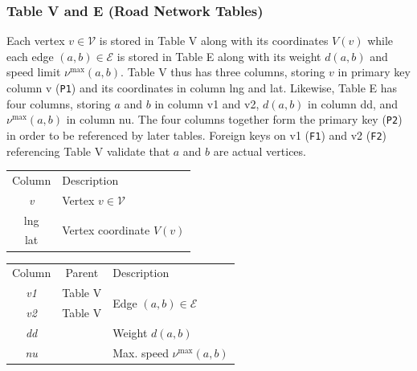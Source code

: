 \documentclass{article}
\theoremstyle{definition}
\begin{document}
\subsubsection{Table V and E (Road Network Tables)}
Each vertex $v\in\mathcal{V}$ is stored in Table V along with its coordinates
$V(v)$ while each edge $(a,b)\in\mathcal{E}$ is stored in Table E along with
its weight $d(a,b)$ and speed limit $\nu^\textrm{max}(a,b)$.  Table V thus has
three columns, storing $v$ in primary key column \textsf{v} ({\tt{}P1}) and its
coordinates in column \textsf{lng} and \textsf{lat}.  Likewise, Table E has
four columns, storing $a$ and $b$ in column \textsf{v1} and \textsf{v2},
$d(a,b)$ in column \textsf{dd}, and $\nu^\textrm{max}(a,b)$ in column
\textsf{nu}.  The four columns together form the primary key ({\tt{}P2}) in order
to be referenced by later tables.  Foreign keys on \textsf{v1} ({\tt{}F1}) and
\textsf{v2} ({\tt{}F2}) referencing Table V validate that $a$ and $b$ are actual
vertices.
\begin{table}[h]
\centering
\small
\begin{tabular}{|c|l|}
\hline
\rowcolor{TableTitle}
\multicolumn{2}{|c|}{Table V (Vertices)}\\
\hline
\rowcolor{TableHeader}
Column & Description\\
\hline
\textit{v} & Vertex $v\in\mathcal{V}$\\
\hline
lng & \multirow{2}{*}{Vertex coordinate $V(v)$}\\
lat & \\
\hline
\end{tabular}
\begin{tabular}{|c|c|l|}
\hline
\rowcolor{TableTitle}
\multicolumn{3}{|c|}{Table E (Edges)}\\
\hline
\rowcolor{TableHeader}
Column & Parent & Description\\
\hline
\textit{v1} & Table V & \multirow{2}{*}{Edge $(a, b)\in\mathcal{E}$} \\
\cline{2-2}
\textit{v2} & Table V & \\
\hline
\textit{dd} & & Weight $d(a,b)$\\
\hline
\textit{nu} & & Max. speed $\nu^\textrm{max}(a,b)$\\
\hline
\end{tabular}
\end{table}
\nwenddocs{}\endmoddef{}
\end{document}
